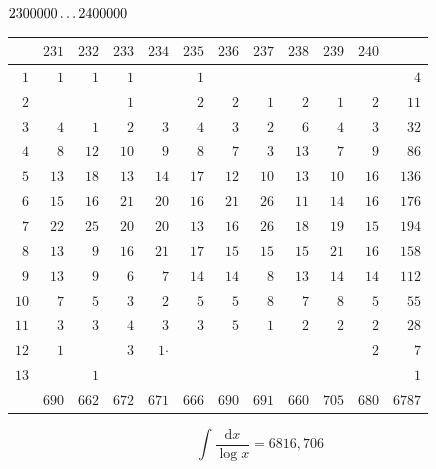 \par\medskip
\noindent\begin{minipage}{\linewidth}\centering
{}
\(2300000\mathinner{.\,.\,.}2400000\)\par\smallskip
\begingroup\fontsize{10.5}{11.5}\selectfont\setlength{\tabcolsep}{3.5pt}\renewcommand{\arraystretch}{1}
\begin{tabular}{r|rrrrrrrrrr|r}\hline
 & $231$ & $232$ & $233$ & $234$ & $235$ & $236$ & $237$ & $238$ & $239$ & $240$ &  \\ \hline
$1$ & $1$ & $1$ & $1$ &  & $1$ &  &  &  &  &  & $4$ \\
$2$ &  &  & $1$ &  & $2$ & $2$ & $1$ & $2$ & $1$ & $2$ & $11$ \\
$3$ & $4$ & $1$ & $2$ & $3$ & $4$ & $3$ & $2$ & $6$ & $4$ & $3$ & $32$ \\
$4$ & $8$ & $12$ & $10$ & $9$ & $8$ & $7$ & $3$ & $13$ & $7$ & $9$ & $86$ \\
$5$ & $13$ & $18$ & $13$ & $14$ & $17$ & $12$ & $10$ & $13$ & $10$ & $16$ & $136$ \\
$6$ & $15$ & $16$ & $21$ & $20$ & $16$ & $21$ & $26$ & $11$ & $14$ & $16$ & $176$ \\
$7$ & $22$ & $25$ & $20$ & $20$ & $13$ & $16$ & $26$ & $18$ & $19$ & $15$ & $194$ \\
$8$ & $13$ & $9$ & $16$ & $21$ & $17$ & $15$ & $15$ & $15$ & $21$ & $16$ & $158$ \\
$9$ & $13$ & $9$ & $6$ & $7$ & $14$ & $14$ & $8$ & $13$ & $14$ & $14$ & $112$ \\
$10$ & $7$ & $5$ & $3$ & $2$ & $5$ & $5$ & $8$ & $7$ & $8$ & $5$ & $55$ \\
$11$ & $3$ & $3$ & $4$ & $3$ & $3$ & $5$ & $1$ & $2$ & $2$ & $2$ & $28$ \\
$12$ & $1$ &  & $3$ & $1\mathord{\cdot}$ &  &  &  &  &  & $2$ & $7$ \\
$13$ &  & $1$ &  &  &  &  &  &  &  &  & $1$ \\
\hline
 & $690$ & $662$ & $672$ & $671$ & $666$ & $690$ & $691$ & $660$ & $705$ & $680$ & $6787$ \\ \hline
\end{tabular}\par\endgroup
\setlength{\abovedisplayskip}{6pt}\setlength{\belowdisplayskip}{4pt}
\[\int\frac{\mathrm{d}x}{\log x}=6816{,}706\]
\end{minipage}\par

